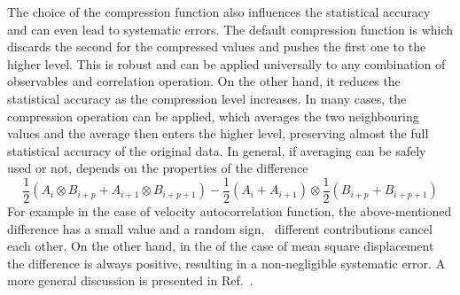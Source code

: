 The choice of the compression function also influences the statistical
accuracy and can even lead to systematic errors. The default compression 
function is  which discards the second for the compressed 
values and pushes the first one to the higher level. This is robust and 
can be applied universally to any combination of observables and
correlation operation. On the other hand, it reduces the
statistical accuracy as the compression level increases.
In many cases, the  compression operation
can be applied, which averages the two neighbouring values
and the average then enters the higher level, preserving
almost the full statistical accuracy of the original data. 
In general, if averaging can be safely used or not, depends on the 
properties of the difference
\begin{equation} 
\frac{1}{2} (A_i \otimes B_{i+p} + A_{i+1} \otimes B_{i+p+1} ) - 
\frac{1}{2} (A_i + A_{i+1} ) \otimes \frac{1}{2} (B_{i+p} +  B_{i+p+1})
\label{eq:difference}
\end{equation} 
For example in the case of velocity autocorrelation function, the
above-mentioned difference has a small value and a random sign, \ie\ 
different contributions cancel each other. On the other hand, in the
of the case of mean square displacement the difference is always positive,
resulting in a non-negligible systematic error. A more general
discussion is presented in Ref.~\cite{ramirez10a}.
